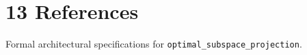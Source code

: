 \section{13 References}

Formal architectural specifications for \texttt{optimal_subspace_projection}.
